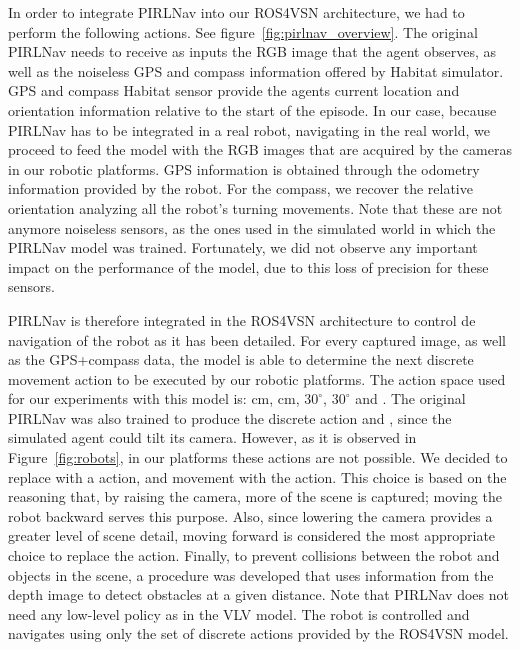 In order to integrate PIRLNav into our ROS4VSN architecture, we had to perform the following actions.
See figure~\ref{fig:pirlnav_overview}.
The original PIRLNav needs to receive as inputs the RGB image that the agent observes, as well as the noiseless GPS and compass information offered by Habitat simulator.
GPS and compass Habitat sensor provide the agent\textquotesingle s current location and orientation information relative to the start of the episode.
In our case, because PIRLNav has to be integrated in a real robot, navigating in the real world, we proceed to feed the model with the RGB images that are acquired by the cameras in our robotic platforms.
GPS information is obtained through the odometry information provided by the robot.
For the compass, we recover the relative orientation analyzing all the robot's turning movements.
Note that these are not anymore noiseless sensors, as the ones used in the simulated world in which the PIRLNav model was trained.
Fortunately, we did not observe any important impact on the performance of the model, due to this loss of precision for these sensors.

PIRLNav is therefore integrated in the ROS4VSN architecture to control de navigation of the robot as it has been detailed.
For every captured image, as well as the GPS+compass data, the model is able to determine the next discrete movement action to be executed by our robotic platforms.
The action space used for our experiments with this model is:  cm,  cm, \turnright $30^\circ$, \turnleft  $30^\circ$ and \stopac.
The original PIRLNav was also trained to produce the discrete action \lookup and \lookdown, since the simulated agent could tilt its camera.
However, as it is observed in Figure~\ref{fig:robots}, in our platforms these actions are not possible.
We decided to replace \lookup with a \movebackward action, and \lookdown movement with the \moveforward action.
This choice is based on the reasoning that, by raising the camera, more of the scene is captured; moving the robot backward serves this purpose.
Also, since lowering the camera provides a greater level of scene detail, moving forward is considered the most appropriate choice to replace the \lookdown action.
Finally, to prevent collisions between the robot and objects in the scene, a procedure was developed that uses information from the depth image to detect obstacles at a given distance.
Note that PIRLNav does not need any low-level policy as in the VLV model.
The robot is controlled and navigates using only the set of discrete actions provided by the ROS4VSN model.




